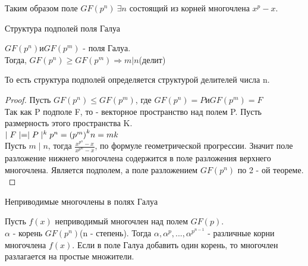 Таким образом поле $GF(p^n)\ \exists n$ состоящий из корней многочлена $x^p-x$.

\begin{title}
  Структура подполей поля Галуа
\end{title}

\begin{theorem}
  $GF(p^n) и GF(p^m)$ - поля Галуа.\\
Тогда, $GF(p^n) \ge GF(p^m) \Rightarrow m|n$(делит)
\end{theorem}

То есть структура подполей определяется структурой делителей числа n.\\

\begin{proof}
          Пусть $GF(p^n) \le GF(p^m)$, где $GF(p^n) = P и GF(p^m) = F$\\
Так как P подполе F, то - векторное пространство над полем P. Пусть размерность
этого пространства K.\\
$\mid F \mid = \mid P \mid^k\\
p^n = {(p^m)}^k\\
n = mk$\\
Пусть $m\mid n$, тогда $\frac{x^{p^n} - x}{x^{p^m} - x}$, по формуле геометрической прогрессии.
Значит поле разложение нижнего многочлена содержится в поле разложения верхнего
многочлена. Является подполем, а поле разложением $GF(p^n)$ по 2 - ой теореме.\\
\end{proof}

\begin{title}
  {Неприводимые многочлены в полях Галуа}
\end{title}

\begin{theorem}
  Пусть $f(x)$ неприводимый многочлен над полем $GF(p)$.\\
$\alpha$ - корень $GF(p^n)$(n - степень). Тогда $\alpha, \alpha^p,...,
\alpha^{p^{n-1}}$
- различные корни многочлена $f(x)$. Если в поле Галуа добавить один корень, то
многочлен разлагается на простые множители.\\
\end{theorem}

